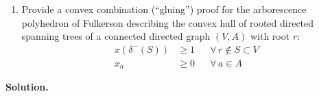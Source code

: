 \documentclass[11pt,letterpaper]{article}
\newtheorem{claim}[theorem]{Claim}
\theoremstyle{definition}
\newcommand{\reals}{\mathbb{R}}
\newcommand{\solution}{\medskip\noindent\textbf{Solution.}\par\medskip}
\begin{document}
\begin{enumerate}[resume=q]
\item[8.*] Provide a convex combination (``gluing'') proof for the arborescence polyhedron of Fulkerson describing the convex hull of rooted directed spanning trees of a connected directed graph $(V,A)$ with root $r$:
\begin{align*}
    x(\delta^-(S)) &\geq 1 && \forall\, r \notin S \subset V \\
    x_a &\geq 0 && \forall\, a \in A
\end{align*}
\end{enumerate}

\solution






\end{document}
